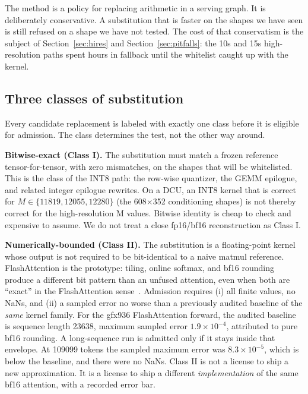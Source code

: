 \documentclass[11pt]{article}
\begin{document}
The method is a policy for replacing arithmetic in a serving graph. It is deliberately conservative. A substitution that is faster on the shapes we have seen is still refused on a shape we have not tested. The cost of that conservatism is the subject of Section~\ref{sec:hires} and Section~\ref{sec:pitfalls}: the 10s and 15s high-resolution paths spent hours in fallback until the whitelist caught up with the kernel.

\subsection{Three classes of substitution}
\label{sec:classes}

Every candidate replacement is labeled with exactly one class before it is eligible for admission. The class determines the test, not the other way around.

\textbf{Bitwise-exact (Class I).} The substitution must match a frozen reference tensor-for-tensor, with zero mismatches, on the shapes that will be whitelisted. This is the class of the INT8 path: the row-wise quantizer, the GEMM epilogue, and related integer epilogue rewrites. On a DCU, an INT8 kernel that is correct for $M \in \{11819, 12055, 12280\}$ (the 608$\times$352 conditioning shapes) is not thereby correct for the high-resolution M values. Bitwise identity is cheap to check and expensive to assume. We do not treat a close fp16/bf16 reconstruction as Class I.

\textbf{Numerically-bounded (Class II).} The substitution is a floating-point kernel whose output is not required to be bit-identical to a naive matmul reference. FlashAttention is the prototype: tiling, online softmax, and bf16 rounding produce a different bit pattern than an unfused attention, even when both are ``exact'' in the FlashAttention sense~\cite{4,5}. Admission requires (i) all finite values, no NaNs, and (ii) a sampled error no worse than a previously audited baseline of the \emph{same} kernel family. For the gfx936 FlashAttention forward, the audited baseline is sequence length 23638, maximum sampled error $1.9\times 10^{-4}$, attributed to pure bf16 rounding. A long-sequence run is admitted only if it stays inside that envelope. At 109099 tokens the sampled maximum error was $8.3\times 10^{-5}$, which is below the baseline, and there were no NaNs. Class II is not a license to ship a new approximation. It is a license to ship a different \emph{implementation} of the same bf16 attention, with a recorded error bar.
\end{document}
